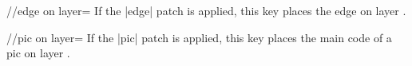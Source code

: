 \begin{multicols}{2}
\begin{key}{/\tikzext/edge on layer=}
If the |edge| patch is applied, this key places the edge on layer .
\end{key}

\begin{key}{/\tikzext/pic on layer=}
If the |pic| patch is applied, this key places the main code of a pic on layer .
\end{key}
\end{multicols}
\begin{codeexample}[width=.5\linewidth,preamble=\usetikzlibrary{ext.layers}]
\end{codeexample}